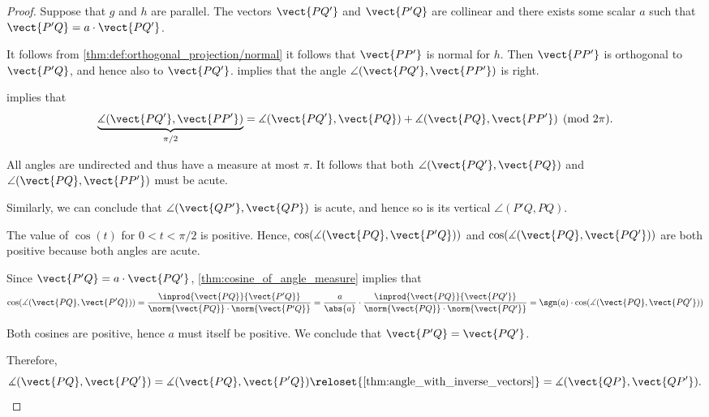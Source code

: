 \begin{proof}
   Suppose that \( g \) and \( h \) are parallel. The vectors \( \vect{PQ'} \) and \( \vect{P'Q} \) are collinear and there exists some scalar \( a \) such that \( \vect{P'Q} = a \cdot \vect{PQ'} \).

  It follows from \cref{thm:def:orthogonal_projection/normal} it follows that \( \vect{PP'} \) is normal for \( h \). Then \( \vect{PP'} \) is orthogonal to \( \vect{P'Q} \), and hence also to \( \vect{PQ'} \).  implies that the angle \( \angle(\vect{PQ'}, \vect{PP'}) \) is right.

   implies that
  \begin{equation*}
    \underbrace{\measuredangle(\vect{PQ'}, \vect{PP'})}_{\pi / 2} = \measuredangle(\vect{PQ'}, \vect{PQ}) + \measuredangle(\vect{PQ}, \vect{PP'}) \pmod {2\pi}.
  \end{equation*}

  All angles are undirected and thus have a measure at most \( \pi \). It follows that both \( \angle(\vect{PQ'}, \vect{PQ}) \) and \( \angle(\vect{PQ}, \vect{PP'}) \) must be acute.

  Similarly, we can conclude that \( \angle(\vect{QP'}, \vect{QP}) \) is acute, and hence so is its vertical \( \angle(P'Q, PQ) \).

  The value of \( \cos(t) \) for \( 0 < t < \pi / 2 \) is positive. Hence, \( \cos(\measuredangle(\vect{PQ}, \vect{P'Q})) \) and \( \cos(\measuredangle(\vect{PQ}, \vect{PQ'})) \) are both positive because both angles are acute.

  Since \( \vect{P'Q} = a \cdot \vect{PQ'} \), \cref{thm:cosine_of_angle_measure} implies that
  \begin{equation*}
    \cos(\measuredangle(\vect{PQ}, \vect{P'Q}))
    =
    \frac {\inprod {\vect{PQ}} {\vect{P'Q}}} {\norm{\vect{PQ}} \cdot \norm{\vect{P'Q}}}
    =
    \frac a {\abs{a}} \cdot \frac {\inprod {\vect{PQ}} {\vect{PQ'}}} {\norm{\vect{PQ}} \cdot \norm{\vect{PQ'}}}
    =
    \sgn(a) \cdot \cos(\measuredangle(\vect{PQ}, \vect{PQ'}))
  \end{equation*}

  Both cosines are positive, hence \( a \) must itself be positive. We conclude that \( \vect{P'Q} = \vect{PQ'} \).

  Therefore,
  \begin{equation*}
    \measuredangle(\vect{PQ}, \vect{PQ'})
    =
    \measuredangle(\vect{PQ}, \vect{P'Q})
    \reloset {\ref{thm:angle_with_inverse_vectors}} =
    \measuredangle(\vect{QP}, \vect{QP'}).
  \end{equation*}


\end{proof}
